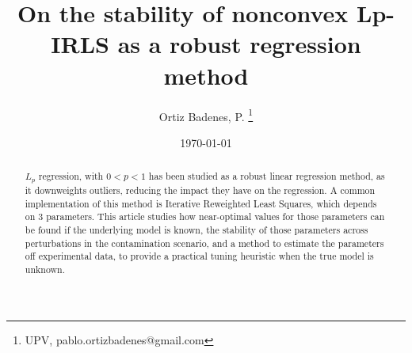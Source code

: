 \documentclass[10pt,a4paper]{article}
\title{\textbf{On the stability of nonconvex Lp-IRLS as a robust regression method}}
\author{
  Ortiz Badenes, P. \thanks{ UPV, pablo.ortizbadenes@gmail.com}
}
\date{\today}
\makeatletter
\newcommand{\twocoltitle}[1]{%
  \begin{@twocolumnfalse}
    \maketitle
    \vspace{-1em}
  \end{@twocolumnfalse}%
}
\makeatother
\begin{document}
\twocoltitle{}

\begin{@twocolumnfalse}
\begin{abstract}
\noindent
$L_p$ regression, with $0<p<1$ has been studied as a robust linear regression method, as it downweights outliers, reducing the impact they have on the regression. A common implementation of this method is Iterative Reweighted Least Squares, which depends on 3 parameters. This article studies how near-optimal values for those parameters can be found if the underlying model is known, the stability of those parameters across perturbations in the contamination scenario, and a method to estimate the parameters off experimental data, to provide a practical tuning heuristic when the true model is unknown.
\end{abstract}
\vspace{0.5em}
\end{@twocolumnfalse}
\end{document}
